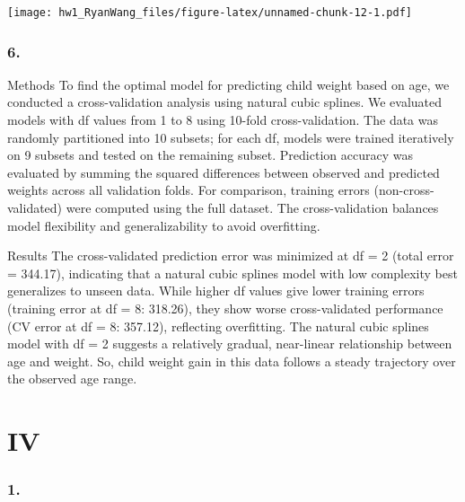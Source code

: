 \documentclass[
]{article}
\newenvironment{Shaded}{\begin{snugshade}}{\end{snugshade}}
\newcommand{\AttributeTok}[1]{\textcolor[rgb]{0.13,0.29,0.53}{#1}}
\newcommand{\ConstantTok}[1]{\textcolor[rgb]{0.56,0.35,0.01}{#1}}
\newcommand{\DecValTok}[1]{\textcolor[rgb]{0.00,0.00,0.81}{#1}}
\newcommand{\FunctionTok}[1]{\textcolor[rgb]{0.13,0.29,0.53}{\textbf{#1}}}
\newcommand{\NormalTok}[1]{#1}
\newcommand{\SpecialCharTok}[1]{\textcolor[rgb]{0.81,0.36,0.00}{\textbf{#1}}}
\newcommand{\StringTok}[1]{\textcolor[rgb]{0.31,0.60,0.02}{#1}}
\begin{document}
\texttt{[image: hw1\_RyanWang\_files/figure-latex/unnamed-chunk-12-1.pdf]}

\subsubsection{6.}\label{section-11}

Methods To find the optimal model for predicting child weight based on
age, we conducted a cross-validation analysis using natural cubic
splines. We evaluated models with df values from 1 to 8 using 10-fold
cross-validation. The data was randomly partitioned into 10 subsets; for
each df, models were trained iteratively on 9 subsets and tested on the
remaining subset. Prediction accuracy was evaluated by summing the
squared differences between observed and predicted weights across all
validation folds. For comparison, training errors (non-cross-validated)
were computed using the full dataset. The cross-validation balances
model flexibility and generalizability to avoid overfitting.

Results The cross-validated prediction error was minimized at df = 2
(total error = 344.17), indicating that a natural cubic splines model
with low complexity best generalizes to unseen data. While higher df
values give lower training errors (training error at df = 8: 318.26),
they show worse cross-validated performance (CV error at df = 8:
357.12), reflecting overfitting. The natural cubic splines model with df
= 2 suggests a relatively gradual, near-linear relationship between age
and weight. So, child weight gain in this data follows a steady
trajectory over the observed age range.

\section{IV}\label{iv}

\subsubsection{1.}\label{section-12}

\begin{Shaded}
\end{Shaded}
\end{document}
